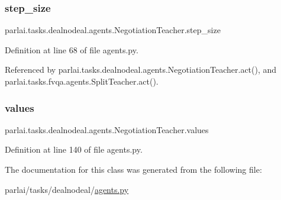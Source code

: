 \subsubsection{\texorpdfstring{step\+\_\+size}{step\_size}}
{\footnotesize\ttfamily parlai.\+tasks.\+dealnodeal.\+agents.\+Negotiation\+Teacher.\+step\+\_\+size}



Definition at line 68 of file agents.\+py.



Referenced by parlai.\+tasks.\+dealnodeal.\+agents.\+Negotiation\+Teacher.\+act(), and parlai.\+tasks.\+fvqa.\+agents.\+Split\+Teacher.\+act().

\mbox{\label{classparlai_1_1tasks_1_1dealnodeal_1_1agents_1_1NegotiationTeacher_a9d33952ac00bfe1ca5a4b1f8311dc617}} 
\subsubsection{\texorpdfstring{values}{values}}
{\footnotesize\ttfamily parlai.\+tasks.\+dealnodeal.\+agents.\+Negotiation\+Teacher.\+values}



Definition at line 140 of file agents.\+py.



The documentation for this class was generated from the following file\+:\begin{DoxyCompactItemize}
\item 
parlai/tasks/dealnodeal/\hyperlink{parlai_2tasks_2dealnodeal_2agents_8py}{agents.\+py}\end{DoxyCompactItemize}

